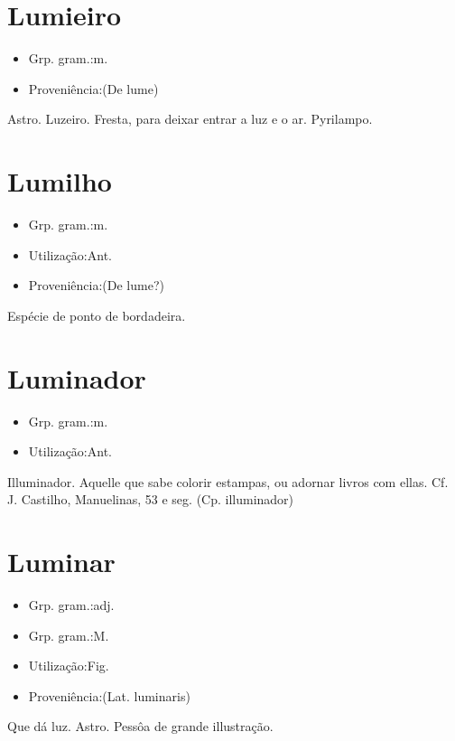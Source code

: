 \section{Lumieiro}
\begin{itemize}
\item {Grp. gram.:m.}
\end{itemize}
\begin{itemize}
\item {Proveniência:(De \textunderscore lume\textunderscore )}
\end{itemize}
Astro.
Luzeiro.
Fresta, para deixar entrar a luz e o ar.
Pyrilampo.
\section{Lumilho}
\begin{itemize}
\item {Grp. gram.:m.}
\end{itemize}
\begin{itemize}
\item {Utilização:Ant.}
\end{itemize}
\begin{itemize}
\item {Proveniência:(De \textunderscore lume\textunderscore ?)}
\end{itemize}
Espécie de ponto de bordadeira.
\section{Luminador}
\begin{itemize}
\item {Grp. gram.:m.}
\end{itemize}
\begin{itemize}
\item {Utilização:Ant.}
\end{itemize}
Illuminador.
Aquelle que sabe colorir estampas, ou adornar livros com ellas. Cf. J. Castilho, \textunderscore Manuelinas\textunderscore , 53 e seg.
(Cp. \textunderscore illuminador\textunderscore )
\section{Luminar}
\begin{itemize}
\item {Grp. gram.:adj.}
\end{itemize}
\begin{itemize}
\item {Grp. gram.:M.}
\end{itemize}
\begin{itemize}
\item {Utilização:Fig.}
\end{itemize}
\begin{itemize}
\item {Proveniência:(Lat. \textunderscore luminaris\textunderscore )}
\end{itemize}
Que dá luz.
Astro.
Pessôa de grande illustração.
